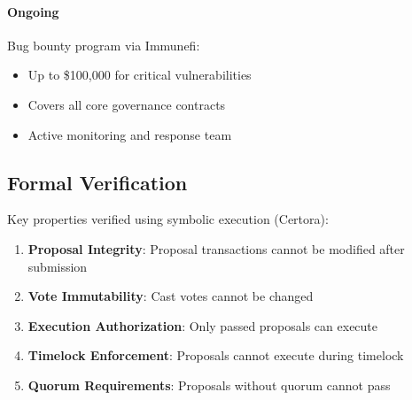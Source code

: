 \paragraph{Ongoing} Bug bounty program via Immunefi:
\begin{itemize}
    \item Up to \$100,000 for critical vulnerabilities
    \item Covers all core governance contracts
    \item Active monitoring and response team
\end{itemize}

\subsection{Formal Verification}

Key properties verified using symbolic execution (Certora):

\begin{enumerate}
    \item \textbf{Proposal Integrity}: Proposal transactions cannot be modified after submission
    \item \textbf{Vote Immutability}: Cast votes cannot be changed
    \item \textbf{Execution Authorization}: Only passed proposals can execute
    \item \textbf{Timelock Enforcement}: Proposals cannot execute during timelock
    \item \textbf{Quorum Requirements}: Proposals without quorum cannot pass
\end{enumerate}

